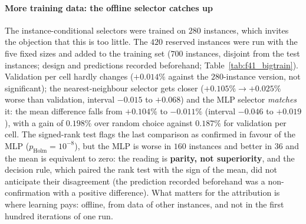 

\paragraph{More training data: the offline selector catches up}
The instance-conditional selectors were trained on $280$ instances, which invites the objection that this is too little. The $420$ reserved instances were run with the five fixed sizes and added to the training set ($700$ instances, disjoint from the test instances; design and predictions recorded beforehand; Table~\ref{tab:f41_bigtrain}).
Validation per cell hardly changes ($+0.014\%$ against the $280$-instance version, not significant); the nearest-neighbour selector gets closer ($+0.105\%\to+0.025\%$ worse than validation, interval $-0.015$ to $+0.068$) and the MLP selector \emph{matches} it: the mean difference falls from $+0.104\%$ to $-0.011\%$ (interval $-0.046$ to $+0.019$),
with a gain of $0.198\%$ over random choice against $0.187\%$ for validation per cell. The signed-rank test flags the last comparison as confirmed in favour of the MLP ($p_{\mathrm{Holm}}=10^{-8}$), but the MLP is worse in $160$ instances and better in $36$ and the mean is equivalent to zero: the reading is \textbf{parity, not superiority}, and the decision rule, which paired the rank test with the sign of the mean,
did not anticipate their disagreement (the prediction recorded beforehand was a non-confirmation with a positive difference). What matters for the attribution is where learning pays: offline, from data of other instances, and not in the first hundred iterations of one run.



